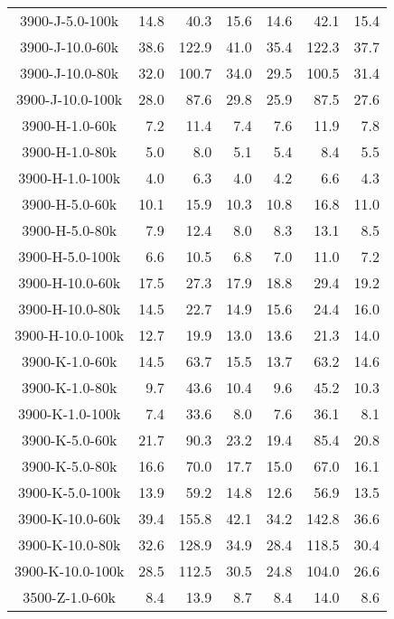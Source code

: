 \begin{longtable}{crrrrrr}
      3900-J-5.0-100k  &  14.8 &  40.3 &  15.6 &  14.6 &  42.1 &  15.4 \\
      3900-J-10.0-60k  &  38.6 & 122.9 &  41.0 &  35.4 & 122.3 &  37.7 \\
      3900-J-10.0-80k  &  32.0 & 100.7 &  34.0 &  29.5 & 100.5 &  31.4 \\
      3900-J-10.0-100k &  28.0 &  87.6 &  29.8 &  25.9 &  87.5 &  27.6 \\
      3900-H-1.0-60k   &   7.2 &  11.4 &   7.4 &   7.6 &  11.9 &   7.8 \\
      3900-H-1.0-80k   &   5.0 &   8.0 &   5.1 &   5.4 &   8.4 &   5.5 \\
      3900-H-1.0-100k  &   4.0 &   6.3 &   4.0 &   4.2 &   6.6 &   4.3 \\
      3900-H-5.0-60k   &  10.1 &  15.9 &  10.3 &  10.8 &  16.8 &  11.0 \\
      3900-H-5.0-80k   &   7.9 &  12.4 &   8.0 &   8.3 &  13.1 &   8.5 \\
      3900-H-5.0-100k  &   6.6 &  10.5 &   6.8 &   7.0 &  11.0 &   7.2 \\
      3900-H-10.0-60k  &  17.5 &  27.3 &  17.9 &  18.8 &  29.4 &  19.2 \\
      3900-H-10.0-80k  &  14.5 &  22.7 &  14.9 &  15.6 &  24.4 &  16.0 \\
      3900-H-10.0-100k &  12.7 &  19.9 &  13.0 &  13.6 &  21.3 &  14.0 \\
      3900-K-1.0-60k   &  14.5 &  63.7 &  15.5 &  13.7 &  63.2 &  14.6 \\
      3900-K-1.0-80k   &   9.7 &  43.6 &  10.4 &   9.6 &  45.2 &  10.3 \\
      3900-K-1.0-100k  &   7.4 &  33.6 &   8.0 &   7.6 &  36.1 &   8.1 \\
      3900-K-5.0-60k   &  21.7 &  90.3 &  23.2 &  19.4 &  85.4 &  20.8 \\
      3900-K-5.0-80k   &  16.6 &  70.0 &  17.7 &  15.0 &  67.0 &  16.1 \\
      3900-K-5.0-100k  &  13.9 &  59.2 &  14.8 &  12.6 &  56.9 &  13.5 \\
      3900-K-10.0-60k  &  39.4 & 155.8 &  42.1 &  34.2 & 142.8 &  36.6 \\
      3900-K-10.0-80k  &  32.6 & 128.9 &  34.9 &  28.4 & 118.5 &  30.4 \\
      3900-K-10.0-100k &  28.5 & 112.5 &  30.5 &  24.8 & 104.0 &  26.6 \\
      3500-Z-1.0-60k   &   8.4 &  13.9 &   8.7 &   8.4 &  14.0 &   8.6 \\

\end{longtable}
